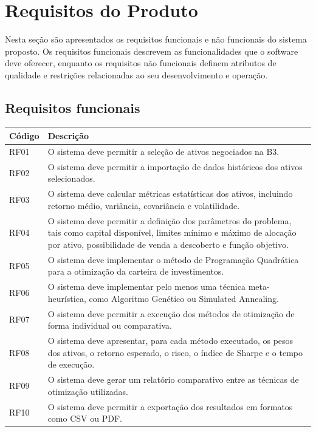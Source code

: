 \documentclass[
	12pt,				%
	openright,			%
	oneside,			    %
	a4paper,				%
	english,			%
	french,			%
	spanish,			%
	brazil			%
	]{abntex2}
\begin{document}
\chapter{Requisitos do Produto}
Nesta seção são apresentados os requisitos funcionais e não funcionais do sistema proposto. Os requisitos funcionais descrevem as funcionalidades que o software deve oferecer, enquanto os requisitos não funcionais definem atributos de qualidade e restrições relacionadas ao seu desenvolvimento e operação.
\section{Requisitos funcionais}

\begin{quadro}[htb]
\caption{Requisitos funcionais do sistema}
\label{qua:requisitos-funcionais}
\begin{tabularx}{\textwidth}{|p{2cm}|X|}
\hline
\textbf{Código} & \textbf{Descrição} \\ \hline
RF01 & O sistema deve permitir a seleção de ativos negociados na B3. \\ \hline
RF02 & O sistema deve permitir a importação de dados históricos dos ativos selecionados. \\ \hline
RF03 & O sistema deve calcular métricas estatísticas dos ativos, incluindo retorno médio, variância, covariância e volatilidade. \\ \hline
RF04 & O sistema deve permitir a definição dos parâmetros do problema, tais como capital disponível, limites mínimo e máximo de alocação por ativo, possibilidade de venda a descoberto e função objetivo. \\ \hline
RF05 & O sistema deve implementar o método de Programação Quadrática para a otimização da carteira de investimentos. \\ \hline
RF06 & O sistema deve implementar pelo menos uma técnica meta-heurística, como Algoritmo Genético ou Simulated Annealing. \\ \hline
RF07 & O sistema deve permitir a execução dos métodos de otimização de forma individual ou comparativa. \\ \hline
RF08 & O sistema deve apresentar, para cada método executado, os pesos dos ativos, o retorno esperado, o risco, o índice de Sharpe e o tempo de execução. \\ \hline
RF09 & O sistema deve gerar um relatório comparativo entre as técnicas de otimização utilizadas. \\ \hline
RF10 & O sistema deve permitir a exportação dos resultados em formatos como CSV ou PDF. \\ \hline
\end{tabularx}

\end{quadro}
\end{document}
